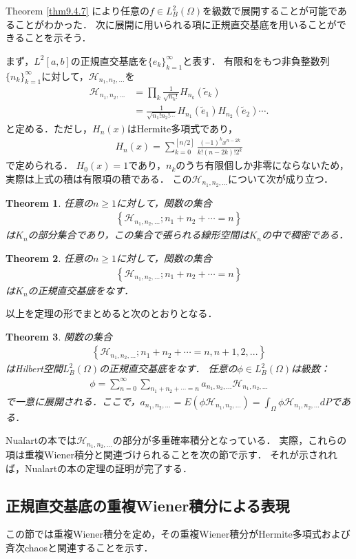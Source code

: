 \documentclass[a4paper,10pt]{jsarticle}
\theoremstyle{plain}
\newtheorem{theorem}{Theorem}
\newcommand{\eq}[1]{\begin{align}#1\end{align}}
\begin{document}
Theorem \ref{thm9.4.7} により任意の$f\in L^2_B(\Omega)$を級数で展開することが可能であることがわかった．
次に展開に用いられる項に正規直交基底を用いることができることを示そう．

まず，$L^2[a,b]$の正規直交基底を$\{e_k\}_{k=1}^\infty$と表す．
有限和をもつ非負整数列$\{n_k\}_{k=1}^\infty$に対して，$\mathcal{H}_{n_1,n_2,...}$を
\eq{\mathcal{H}_{n_1,n_2,...}
	&=\prod_k\frac{1}{\sqrt{n_k!}}H_{n_k}(\tilde{e}_k)\\
	&=\frac{1}{\sqrt{n_1!n_2!\cdots}}H_{n_1}(\tilde{e}_1)H_{n_2}(\tilde{e}_2)\cdots.}
と定める．ただし，$H_n(x)$はHermite多項式であり，
\eq{H_n(x)=\sum_{k=0}^{[n/2]}\frac{(-1)^kx^{n-2k}}{k!(n-2k)!2^k}}
で定められる．
$H_0(x)=1$であり，$n_k$のうち有限個しか非零にならないため，実際は上式の積は有限項の積である．
この$\mathcal{H}_{n_1,n_2,...}$について次が成り立つ．
\begin{theorem}\label{thm9.5.3}%
任意の$n\ge1$に対して，関数の集合
\eq{\left\{\mathcal{H}_{n_1,n_2,...};n_1+n_2+\cdots=n\right\}}
は$K_n$の部分集合であり，この集合で張られる線形空間は$K_n$の中で稠密である．
\end{theorem}

\begin{theorem}\label{thm9.5.4}%
任意の$n\ge1$に対して，関数の集合
\eq{\left\{\mathcal{H}_{n_1,n_2,...};n_1+n_2+\cdots=n\right\}}
は$K_n$の正規直交基底をなす．
\end{theorem}

以上を定理の形でまとめると次のとおりとなる．
\begin{theorem}\label{thm9.5.7}%
関数の集合
\eq{\left\{\mathcal{H}_{n_1,n_2,...};n_1+n_2+\cdots=n,n+1,2,...\right\}}
はHilbert空間$L^2_B(\Omega)$の正規直交基底をなす．
任意の$\phi\in L^2_B(\Omega)$は級数：
\eq{\phi=\sum_{n=0}^\infty\sum_{n_1+n_2+\cdots=n}a_{n_1,n_2,...}\mathcal{H}_{n_1,n_2,...}}
で一意に展開される．ここで，$a_{n_1,n_2,...}=E(\phi\mathcal{H}_{n_1,n_2,...})=\int_\Omega\phi\mathcal{H}_{n_1,n_2,...}dP$である．
\end{theorem}
Nualartの本では$\mathcal{H}_{n_1,n_2,...}$の部分が多重確率積分となっている．
実際，これらの項は重複Wiener積分と関連づけられることを次の節で示す．
それが示されれば，Nualartの本の定理の証明が完了する．

\subsection{正規直交基底の重複Wiener積分による表現}
この節では重複Wiener積分を定め，その重複Wiener積分がHermite多項式および斉次chaosと関連することを示す．
\end{document}
